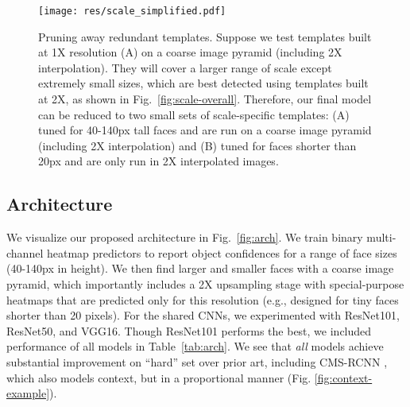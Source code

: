\documentclass[10pt,twocolumn,letterpaper]{article}
\begin{document}
\begin{figure}[t]
  \centering
\texttt{[image: res/scale\_simplified.pdf]}
  \caption{Pruning away redundant templates. Suppose we test templates built at 1X resolution (A) on a coarse image pyramid (including 2X interpolation). They will cover a larger range of scale except extremely small sizes, which are best detected using templates built at 2X, as shown in Fig.~\ref{fig:scale-overall}. Therefore, our final model can be reduced to two small sets of scale-specific templates: (A) tuned for 40-140px tall faces and are run on a coarse image pyramid (including 2X interpolation) and (B) tuned for faces shorter than 20px and are only run in 2X interpolated images. }
\label{fig:scale-simplified}
\end{figure}





\begin{table}
  \centering
  \caption{Pruning away redundant templates does not hurt performance (validation). As a reference, we also included the performance of a vanilla RPN as mentioned in Sec.~\ref{sec:related}. Please refer to Fig.~\ref{fig:scale-simplified} for visualization of (Full) and (A+B).} 
\label{tab:scale-simplified}
\end{table}









\subsection{Architecture}
\label{sec:net}

We visualize our proposed architecture in Fig.~\ref{fig:arch}. We train binary multi-channel heatmap predictors to report object confidences for a range of face sizes (40-140px in height). We then find larger and smaller faces with a coarse image pyramid, which importantly includes a 2X upsampling stage with special-purpose heatmaps that are predicted only for this resolution (e.g., designed for tiny faces shorter than 20 pixels). For the shared CNNs, we experimented with ResNet101, ResNet50, and VGG16. Though ResNet101 performs the best, we included performance of all models in Table~\ref{tab:arch}. We see that {\em all} models achieve substantial improvement on ``hard'' set over prior art, including CMS-RCNN\cite{zhu2016cms} , which also models context, but in a proportional manner (Fig. \ref{fig:context-example}). 
\end{document}

